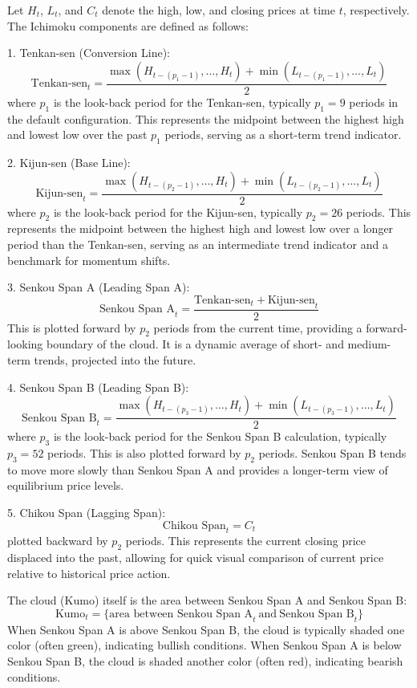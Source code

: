 Let $H_t$, $L_t$, and $C_t$ denote the high, low, and closing prices at time $t$, respectively. The Ichimoku components are defined as follows:

1. Tenkan-sen (Conversion Line):
\[
\text{Tenkan-sen}_t = \frac{\max(H_{t-(p_1-1)}, \dots, H_t) + \min(L_{t-(p_1-1)}, \dots, L_t)}{2}
\]
where $p_1$ is the look-back period for the Tenkan-sen, typically $p_1 = 9$ periods in the default configuration. This represents the midpoint between the highest high and lowest low over the past $p_1$ periods, serving as a short-term trend indicator.

2. Kijun-sen (Base Line):
\[
\text{Kijun-sen}_t = \frac{\max(H_{t-(p_2-1)}, \dots, H_t) + \min(L_{t-(p_2-1)}, \dots, L_t)}{2}
\]
where $p_2$ is the look-back period for the Kijun-sen, typically $p_2 = 26$ periods. This represents the midpoint between the highest high and lowest low over a longer period than the Tenkan-sen, serving as an intermediate trend indicator and a benchmark for momentum shifts.

3. Senkou Span A (Leading Span A):
\[
\text{Senkou Span A}_t = \frac{\text{Tenkan-sen}_t + \text{Kijun-sen}_t}{2}
\]
This is plotted forward by $p_2$ periods from the current time, providing a forward-looking boundary of the cloud. It is a dynamic average of short- and medium-term trends, projected into the future.

4. Senkou Span B (Leading Span B):
\[
\text{Senkou Span B}_t = \frac{\max(H_{t-(p_3-1)}, \dots, H_t) + \min(L_{t-(p_3-1)}, \dots, L_t)}{2}
\]
where $p_3$ is the look-back period for the Senkou Span B calculation, typically $p_3 = 52$ periods. This is also plotted forward by $p_2$ periods. Senkou Span B tends to move more slowly than Senkou Span A and provides a longer-term view of equilibrium price levels.

5. Chikou Span (Lagging Span):
\[
\text{Chikou Span}_t = C_{t}
\]
plotted backward by $p_2$ periods. This represents the current closing price displaced into the past, allowing for quick visual comparison of current price relative to historical price action.

The cloud (Kumo) itself is the area between Senkou Span A and Senkou Span B:
\[
\text{Kumo}_t = \{\text{area between Senkou Span A}_t \ \text{and} \ \text{Senkou Span B}_t\}
\]
When Senkou Span A is above Senkou Span B, the cloud is typically shaded one color (often green), indicating bullish conditions. When Senkou Span A is below Senkou Span B, the cloud is shaded another color (often red), indicating bearish conditions.

